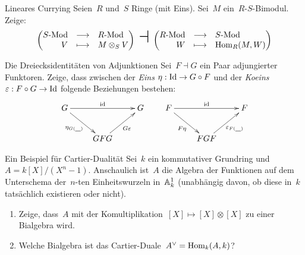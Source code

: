 \documentclass{uebblatt}
\begin{document}
\begin{aufgabe}{Lineares Currying}
Seien~$R$ und~$S$ Ringe (mit Eins).
Sei~$M$ ein~$R$-$S$-Bimodul. Zeige:
\[ \left(\begin{array}{@{}rcl@{}}
  \lMod{S} &\longrightarrow& \lMod{R} \\
  V &\longmapsto& M \otimes_S V
\end{array}\right)\ \text{\huge$\dashv$}\ \left(\begin{array}{@{}rcl@{}}
  \lMod{R} &\longrightarrow& \lMod{S} \\
  W &\longmapsto& \Hom_R(M,W)
\end{array}\right) \]
\vspace{-1em}
\end{aufgabe}

\begin{aufgabe}{Die Dreiecksidentitäten von Adjunktionen}
Sei~$F \dashv G$ ein Paar adjungierter Funktoren. Zeige, dass zwischen
der \emph{Eins} $\eta : \Id \to G \circ F$ und der \emph{Koeins} $\varepsilon :
F \circ G \to \Id$ folgende Beziehungen bestehen:
\[
  \xymatrix{
    G \ar[rd]_{\eta_{G(\smallplaceholder)}} \ar[rr]^{\id} &&
    G \\
    & GFG \ar[ru]_{G \varepsilon}
  }
  \qquad
  \xymatrix{
    F \ar[rd]_{F \eta} \ar[rr]^{\id} &&
    F \\
    & FGF \ar[ru]_{\varepsilon_{F(\smallplaceholder)}}
  }
\]
\vspace{-1em}
\end{aufgabe}

\begin{aufgabe}{Ein Beispiel für Cartier-Dualität}
Sei~$k$ ein kommutativer Grundring und~$A = k[X]/(X^n - 1)$. Anschaulich
ist~$A$ die Algebra der Funktionen auf dem Unterschema der~$n$-ten
Einheitswurzeln in~$\AA^1_k$ (unabhängig davon, ob diese in~$k$ tatsächlich
existieren oder nicht).
\begin{enumerate}
\item Zeige, dass~$A$ mit der Komultiplikation~$[X] \mapsto [X] \otimes [X]$ zu
einer Bialgebra wird.
\item Welche Bialgebra ist das Cartier-Duale~$A^\vee = \Hom_k(A,k)$?
\end{enumerate}
\end{aufgabe}
\end{document}
